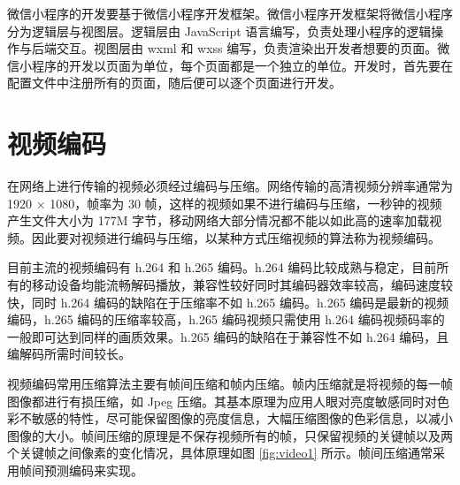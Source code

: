 微信小程序的开发要基于微信小程序开发框架。微信小程序开发框架将微信小程序分为逻辑层与视图层。逻辑层由 JavaScript 语言编写，负责处理小程序的逻辑操作与后端交互。视图层由 wxml 和 wxss 编写，负责渲染出开发者想要的页面。微信小程序的开发以页面为单位，每个页面都是一个独立的单位。开发时，首先要在配置文件中注册所有的页面，随后便可以逐个页面进行开发。


\section{视频编码}

在网络上进行传输的视频必须经过编码与压缩。网络传输的高清视频分辨率通常为 1920 $\times$ 1080，帧率为 30 帧，这样的视频如果不进行编码与压缩，一秒钟的视频产生文件大小为 177M 字节，移动网络大部分情况都不能以如此高的速率加载视频。因此要对视频进行编码与压缩，以某种方式压缩视频的算法称为视频编码。

目前主流的视频编码有 h.264\cite{richardson2004h} 和 h.265\cite{万帅2014新一代高效视频编码} 编码。h.264 编码比较成熟与稳定，目前所有的移动设备均能流畅解码播放，兼容性较好同时其编码器效率较高，编码速度较快，同时 h.264 编码的缺陷在于压缩率不如 h.265 编码。h.265 编码是最新的视频编码，h.265 编码的压缩率较高，h.265 编码视频只需使用 h.264 编码视频码率的一般即可达到同样的画质效果。h.265 编码的缺陷在于兼容性不如 h.264 编码，且编解码所需时间较长。

视频编码常用压缩算法主要有帧间压缩和帧内压缩。帧内压缩就是将视频的每一帧图像都进行有损压缩，如 Jpeg 压缩。其基本原理为应用人眼对亮度敏感同时对色彩不敏感的特性，尽可能保留图像的亮度信息，大幅压缩图像的色彩信息，以减小图像的大小。帧间压缩的原理是不保存视频所有的帧，只保留视频的关键帧以及两个关键帧之间像素的变化情况，具体原理如图 \ref{fig:video1} 所示。帧间压缩通常采用帧间预测编码来实现\cite{richardson2004h}。

